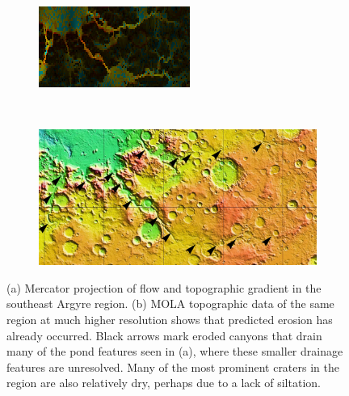 \documentclass[12pt]{iopart}
\numberwithin{equation}{section}
\begin{document}
\begin{figure}
    \centering
    \begin{subfigure}[b]{0.45\textwidth}
        \includegraphics[width=\textwidth]{FlowArgyre2.png}
        \caption{}
        \label{fig:FlowArgyre}
    \end{subfigure}
    ~
    \begin{subfigure}[b]{0.49\textwidth}
      \includegraphics[width=\textwidth]{MOLAArgyreWithArrows.png}
      \caption{}
      \label{fig:MOLAArgyre}
    \end{subfigure}
    \caption{\small{(a) Mercator projection of flow and topographic gradient in the southeast Argyre region. (b) MOLA topographic data of the same region at much higher resolution shows that predicted erosion has already occurred. Black arrows mark eroded canyons that drain many of the pond features seen in (a), where these smaller drainage features are unresolved. Many of the most prominent craters in the region are also relatively dry, perhaps due to a lack of siltation.}}
\label{fig:Validation}
\end{figure}
\end{document}
